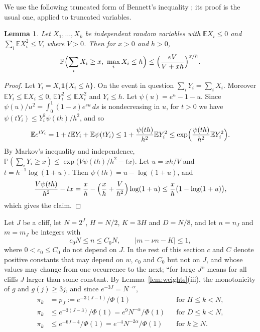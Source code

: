 \documentclass[11pt]{amsart}
\newtheorem{lemma}[theorem]{Lemma}
\theoremstyle{remark}
\numberwithin{equation}{section}
\newcommand{\Pp}{\mathbb P}
\newcommand{\E}{\mathbb E}
\begin{document}
We use the following truncated form of Bennett's inequality \cite{Ben62}; its proof is the usual one, applied to truncated variables.

\begin{lemma}\label{lem:bennett}
Let $X_1,\dots,X_k$ be independent random variables with $\E X_i\le0$ and $\sum_i\E X_i^2\le V$, where $V>0$. Then for $x>0$ and $h>0$,
\[
\Pp\Bigl(\sum_iX_i\ge x,\ \max_iX_i\le h\Bigr)\le\Bigl(\frac{eV}{V+xh}\Bigr)^{x/h}.
\]
\end{lemma}

\begin{proof}
Let $Y_i=X_i\mathbf 1\{X_i\le h\}$. On the event in question $\sum_iY_i=\sum_iX_i$. Moreover $\E Y_i\le\E X_i\le0$, $\E Y_i^2\le\E X_i^2$ and $Y_i\le h$. Let $\psi(u)=e^u-1-u$. Since $\psi(u)/u^2=\int_0^1(1-s)e^{su}\,ds$ is nondecreasing in $u$, for $t>0$ we have $\psi(tY_i)\le Y_i^2\psi(th)/h^2$, and so
\[
\E e^{tY_i}=1+t\E Y_i+\E\psi(tY_i)\le1+\frac{\psi(th)}{h^2}\E Y_i^2\le\exp\Bigl(\frac{\psi(th)}{h^2}\E Y_i^2\Bigr).
\]
By Markov's inequality and independence, $\Pp(\sum_iY_i\ge x)\le\exp\bigl(V\psi(th)/h^2-tx\bigr)$. Let $u=xh/V$ and $t=h^{-1}\log(1+u)$. Then $\psi(th)=u-\log(1+u)$, and
\[
\frac{V\psi(th)}{h^2}-tx=\frac xh-\Bigl(\frac xh+\frac V{h^2}\Bigr)\log(1+u)\le\frac xh\bigl(1-\log(1+u)\bigr),
\]
which gives the claim.
\end{proof}

Let $J$ be a cliff, let $N=2^J$, $H=N/2$, $K=3H$ and $D=N/8$, and let $n=n_J$ and $m=m_J$ be integers with
\begin{equation}\label{eq:mn}
c_0N\le n\le C_0N,\qquad|m-\nu n-K|\le1,
\end{equation}
where $0<c_0\le C_0$ do not depend on $J$. In the rest of this section $c$ and $C$ denote positive constants that may depend on $w$, $c_0$ and $C_0$ but not on $J$, and whose values may change from one occurrence to the next; ``for large $J$'' means for all cliffs $J$ larger than some constant. By Lemma~\ref{lem:weights}(iii), the monotonicity of $g$ and $g(j)\ge3j$, and since $e^{-3J}=N^{-\alpha}$,
\begin{align}
\pi_k&=p_J:=e^{-3(J-1)}/\Phi(1)&&\text{for }H\le k<N,\label{eq:pH}\\
\pi_k&\le e^{-3(J-3)}/\Phi(1)=e^9N^{-\alpha}/\Phi(1)&&\text{for }D\le k<N,\label{eq:pD}\\
\pi_k&\le e^{-6J-4}/\Phi(1)=e^{-4}N^{-2\alpha}/\Phi(1)&&\text{for }k\ge N.\label{eq:pN}
\end{align}
\end{document}
